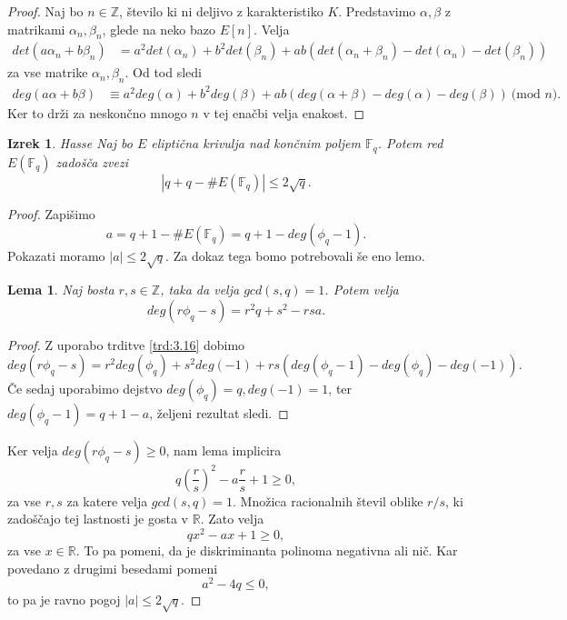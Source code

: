 \documentclass[12pt,a4paper,twoside]{article}
\theoremstyle{definition} %
\theoremstyle{plain} %
\newtheorem{lema}[definicija]{Lema}
\newtheorem{izrek}[definicija]{Izrek}
\numberwithin{equation}{section}  %
\newcommand{\R}{\mathbb R}
\newcommand{\Z}{\mathbb Z}
\newcommand{\F}{\mathbb F}
\newcommand{\E}[1]{E({#1})}
\newcommand{\MOD}[1]{\ \text{(mod }{#1}\text{)}}
\begin{document}
\begin{proof}
Naj bo $n \in \Z$, število ki ni deljivo z karakteristiko $K$. Predstavimo $\alpha,\beta$ z matrikami $\alpha_n,\beta_n$, glede na neko bazo $E[n]$.
Velja
\begin{align}
det(a\alpha_n+b\beta_n) &{}=  a^2det(\alpha_n)+b^2det(\beta_n) + ab(det(\alpha_n+\beta_n)-det(\alpha_n)-det(\beta_n)) \nonumber
\end{align}
za vse matrike $\alpha_n,\beta_n$.
Od tod sledi
\begin{align}
deg(a\alpha+b\beta) &{}\equiv a^2deg(\alpha)+b^2deg(\beta) + ab(deg(\alpha+\beta)-deg(\alpha)-deg(\beta)) \MOD{n}. \nonumber
\end{align}
Ker to drži za neskončno mnogo $n$ v tej enačbi velja enakost.


\end{proof}

\begin{izrek}{Hasse}
\label{izr:Hasse}
Naj bo $E$ eliptična krivulja nad končnim poljem $\F_q$.  Potem red $\E{\F_q}$ zadošča zvezi
$$|q+q-\#\E{\F_q}| \leq 2\sqrt{q}.$$
\end{izrek}

\begin{proof}
Zapišimo
$$a=q+1-\#\E{\F_q} = q+1 -deg(\phi_q-1).$$
Pokazati moramo $|a| \leq 2\sqrt{q}.$
Za dokaz tega bomo potrebovali še eno lemo.
\begin{lema}
Naj bosta $r,s \in \Z$, taka da velja $gcd(s,q)=1$. Potem velja
$$deg(r\phi_q-s) = r^2q+s^2-rsa.$$
\end{lema}

\begin{proof}
Z uporabo trditve \ref{trd:3.16} dobimo
$$deg(r\phi_q-s) = r^2deg(\phi_q)+s^2deg(-1)+rs(deg(\phi_q-1)-deg(\phi_q)-deg(-1)).$$
Če sedaj uporabimo dejstvo $deg(\phi_q) = q,deg(-1) = 1$, ter $deg(\phi_q-1) = q+1-a$, željeni rezultat sledi.
\end{proof}

Ker velja $deg(r\phi_q-s) \geq 0$, nam lema implicira
$$q(\frac{r}{s})^2-a\frac{r}{s}+1 \geq 0,$$
za vse $r,s$ za katere velja $gcd(s,q)=1$. Množica racionalnih števil oblike $r/s$, ki zadoščajo tej lastnosti je gosta v $\R$. Zato velja
$$qx^2-ax + 1 \geq 0,$$
za vse $x\in \R$. To pa pomeni, da je diskriminanta polinoma negativna ali nič. Kar povedano z drugimi besedami pomeni
$$a^2-4q \leq 0,$$
to pa je ravno pogoj $|a|\leq 2\sqrt{q}$.


\end{proof}
\end{document}
